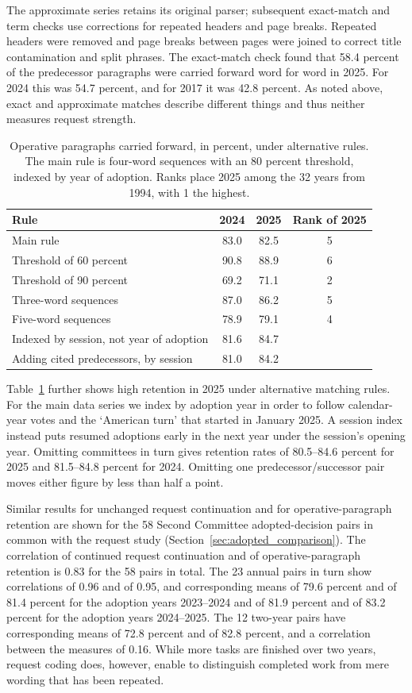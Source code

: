 \documentclass[10pt,authoryear]{elsarticle}
\begin{document}
The approximate series retains its original parser; subsequent exact-match and term checks use corrections for repeated headers and page breaks. Repeated headers were removed and page breaks between pages were joined to correct title contamination and split phrases. The exact-match check found that 58.4 percent of the predecessor paragraphs were carried forward word for word in 2025. For 2024 this was 54.7 percent, and for 2017 it was 42.8 percent. As noted above, exact and approximate matches describe different things and thus neither measures request strength.

\begin{table}[ht]
\centering\small
\caption{Operative paragraphs carried forward, in percent, under alternative rules. The main rule is four-word sequences with an 80 percent threshold, indexed by year of adoption. Ranks place 2025 among the 32 years from 1994, with 1 the highest.}
\label{tab:text_reuse_rules}
\begin{tabular}{lccc}
\toprule
Rule & 2024 & 2025 & Rank of 2025 \\
\midrule
Main rule & 83.0 & 82.5 & 5 \\
Threshold of 60 percent & 90.8 & 88.9 & 6 \\
Threshold of 90 percent & 69.2 & 71.1 & 2 \\
Three-word sequences & 87.0 & 86.2 & 5 \\
Five-word sequences & 78.9 & 79.1 & 4 \\
\addlinespace
Indexed by session, not year of adoption & 81.6 & 84.7 & \\
Adding cited predecessors, by session & 81.0 & 84.2 & \\
\bottomrule
\end{tabular}
\end{table}

Table~\ref{tab:text_reuse_rules} further shows high retention in 2025 under alternative matching rules. For the main data series we index by adoption year in order to follow calendar-year votes and the ‘American turn’ that started in January 2025. A session index instead puts resumed adoptions early in the next year under the session’s opening year. Omitting committees in turn gives retention rates of 80.5--84.6 percent for 2025 and 81.5--84.8 percent for 2024. Omitting one predecessor/successor pair moves either figure by less than half a point.

Similar results for unchanged request continuation and for operative-paragraph retention are shown for the 58 Second Committee adopted-decision pairs in common with the request study (Section~\ref{sec:adopted_comparison}). The correlation of continued request continuation and of operative-paragraph retention is 0.83 for the 58 pairs in total. The 23 annual pairs in turn show correlations of 0.96 and of 0.95, and corresponding means of 79.6 percent and of 81.4 percent for the adoption years 2023–2024 and of 81.9 percent and of 83.2 percent for the adoption years 2024–2025. The 12 two-year pairs have corresponding means of 72.8 percent and of 82.8 percent, and a correlation between the measures of 0.16. While more tasks are finished over two years, request coding does, however, enable to distinguish completed work from mere wording that has been repeated.
\end{document}
